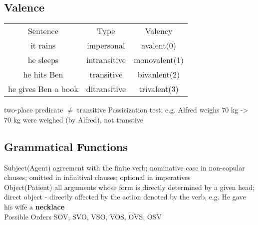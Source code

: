 \subsection*{Valence}
{\tiny
\begin{tabular}{ c c c }
 Sentence & Type & Valency \\ 
 it rains & impersonal & avalent(0) \\  
 he sleeps & intransitive & monovalent(1)   \\
 he hits Ben & transitive & bivanlent(2) \\
 he gives Ben a book & ditransitive & trivalent(3) 
\end{tabular}
}
\scriptsize{two-place predicate $\neq$ transitive} {\tiny Passicization test: e.g. Alfred weighs 70 kg -> 70 kg were weighed (by Alfred), not transtive}
\subsection*{Grammatical Functions}
\scriptsize{Subject(Agent)} {\tiny agreement with the finite verb; nominative case in non-copular clauses; omitted in infinitival clauses; optional in imperatives}\\
\scriptsize{Object(Patient)} {\tiny all arguments whose form is directly determined by a given head; direct object - directly affected by the action denoted by the verb, e.g. He gave his wife a \textbf{necklace}}\\
\scriptsize{Possible Orders} {\tiny SOV, SVO, VSO, VOS, OVS, OSV}
